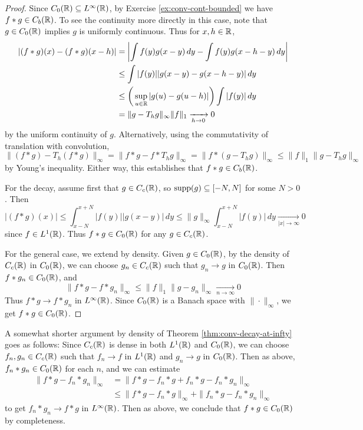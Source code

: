 \begin{proof}
  Since $C_0(\mathbb{R}) \subseteq L^\infty(\mathbb{R})$, by
  Exercise \ref{ex:conv-cont-bounded} we have
  $f * g \in C_b(\mathbb{R})$. To see the continuity
  more directly in this case, note that
  $g \in C_0(\mathbb{R})$ implies $g$ is uniformly continuous.
  Thus for $x, h \in \mathbb{R}$,
  \begin{align*}
    |(f * g)(x) - (f * g)(x - h)|
    &= \left|
    \int f(y) g(x - y)\, dy - \int f(y) g(x - h - y)\, dy
    \right| \\
    &\le \int |f(y)| |g(x - y) - g(x - h - y)|\, dy \\
    &\le \bigg(
      \sup_{u \in \mathbb{R}} |g(u) - g(u - h)|
    \bigg) \int |f(y)|\, dy \\
    &= \|g - T_h g\|_\infty \|f\|_1
    \xrightarrow[h \to 0]{} 0
  \end{align*}
  by the uniform continuity of $g$.
  Alternatively, using the commutativity
  of translation with convolution,
  \[
    \|(f * g) - T_h(f * g)\|_\infty
    = \|f * g - f * T_h g\|_\infty
    = \|f * (g - T_h g)\|_\infty
    \le \|f\|_1 \|g - T_h g\|_\infty
  \]
  by Young's inequality. Either way, this
  establishes that
  $f * g \in C_b(\mathbb{R})$.

  For the decay, assume first that $g \in C_c(\mathbb{R})$,
  so $\operatorname{supp}(g) \subseteq [-N, N]$ for some $N > 0$.
  Then
  \[
    |(f * g)(x)|
    \le \int_{x - N}^{x + N} |f(y)| |g(x - y)|\, dy
    \le \|g\|_\infty \int_{x - N}^{x + N}|f(y)|\, dy
    \xrightarrow[|x| \to \infty]{} 0
  \]
  since $f \in L^1(\mathbb{R})$.
  Thus $f * g \in C_0(\mathbb{R})$ for any $g \in C_c(\mathbb{R})$.

  For the general case, we extend by density.
  Given $g \in C_0(\mathbb{R})$, by the density of
  $C_c(\mathbb{R})$ in $C_0(\mathbb{R})$, we can
  choose $g_n \in C_c(\mathbb{R})$ such that $g_n \to g$
  in $C_0(\mathbb{R})$.
  Then $f * g_n \in C_0(\mathbb{R})$, and
  \[
    \|f * g - f * g_n\|_\infty
    \le \|f\|_1 \|g - g_n\|_\infty
    \xrightarrow[n \to \infty]{} 0
  \]
  Thus $f * g \to f * g_n$ in $L^\infty(\mathbb{R})$.
  Since $C_0(\mathbb{R})$ is a Banach space with
  $\|\cdot\|_\infty$, we
  get $f * g \in C_0(\mathbb{R})$.
\end{proof}

\begin{remark}
  A somewhat shorter argument by density of
  Theorem \ref{thm:conv-decay-at-infty} goes as follows:
  Since $C_c(\mathbb{R})$ is dense in both
  $L^1(\mathbb{R})$ and $C_0(\mathbb{R})$, we can choose
  $f_n, g_n \in C_c(\mathbb{R})$ such that
  $f_n \to f$ in $L^1(\mathbb{R})$ and
  $g_n \to g$ in $C_0(\mathbb{R})$. Then
  as above, $f_n * g_n \in C_0(\mathbb{R})$ for each
  $n$, and we can estimate
  \begin{align*}
    \|f * g - f_n * g_n\|_\infty
    &= \|f * g - f_n * g + f_n * g - f_n * g_n\|_\infty \\
    &\le \|f * g - f_n * g\|_\infty + \|f_n * g - f_n * g_n\|_\infty
  \end{align*}
  to get $f_n * g_n \to f * g$ in $L^\infty(\mathbb{R})$.
  Then as above, we conclude that $f * g \in C_0(\mathbb{R})$
  by completeness.
\end{remark}

